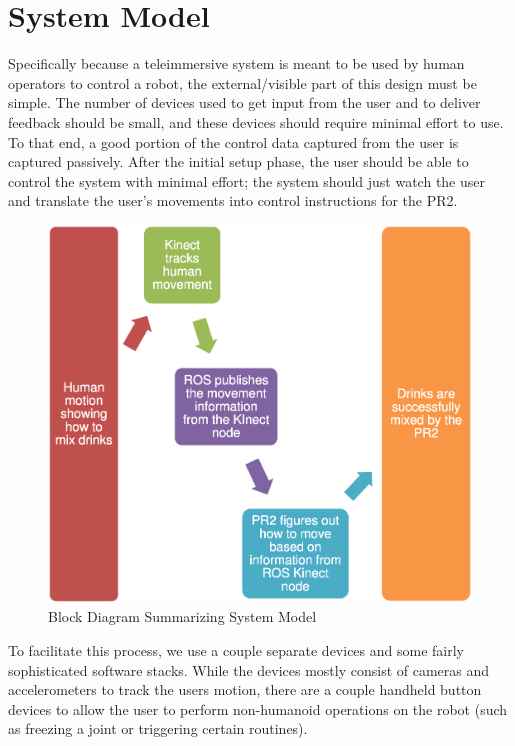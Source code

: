 \documentclass{sig-alternate}
\begin{document}
\section{System Model}
Specifically because a teleimmersive system is meant to be used by human 
operators to control a robot, the external/visible part of this
design must be simple. The number of devices used to get input from the user 
and to deliver feedback should be small, and these devices should require
minimal effort to use. To that
end, a good portion of the control data captured from the user is captured
passively. After the initial setup phase, the user should be able to control
the system with minimal effort; the system should just watch the user and
translate the user's movements into control instructions for the PR2.

\begin{figure}[htb] 
	\begin{center}
		\includegraphics[width=1.0\linewidth]{flowchart}
	\end{center}
	\caption{Block Diagram Summarizing System Model}
	\label{fig:some_graph}
\end{figure}

To facilitate this process, we use a couple separate devices and some
fairly sophisticated software stacks. While the
devices mostly consist of cameras and accelerometers to track the users 
motion, there are a couple handheld button devices to allow the user to
perform non-humanoid operations on the robot (such as freezing a joint or
triggering certain routines).
\end{document}

